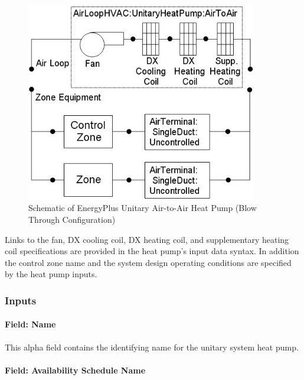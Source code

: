 \begin{figure}[hbtp] %
\centering
\includegraphics[width=0.9\textwidth, height=0.9\textheight, keepaspectratio=true]{media/image300.png}
\caption{Schematic of EnergyPlus Unitary Air-to-Air Heat Pump (Blow Through Configuration) \label{fig:schematic-of-energyplus-unitary-air-to-air-heat-pump-blow-through-configuration}}
\end{figure}

Links to the fan, DX cooling coil, DX heating coil, and supplementary heating coil specifications are provided in the heat pump's input data syntax. In addition the control zone name and the system design operating conditions are specified by the heat pump inputs.

\subsubsection{Inputs}\label{inputs-3-039}

\paragraph{Field: Name}\label{field-name-4-031}

This alpha field contains the identifying name for the unitary system heat pump.

\paragraph{Field: Availability Schedule Name}\label{field-availability-schedule-name-3-006}

